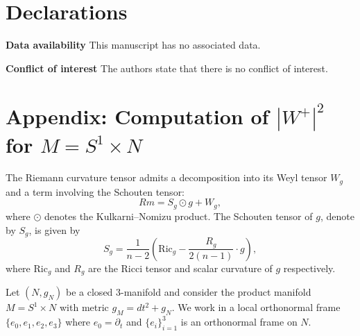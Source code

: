 \documentclass[12pt, twoside]{article}
\theoremstyle{definition}
\numberwithin{equation}{section}
\begin{document}
\section*{Declarations}

\noindent\textbf{Data availability} {This manuscript has no associated data.}

\noindent\textbf{Conflict of interest} The authors state that there is no conflict of interest.


\section*{Appendix: Computation of $|W^+|^2$ for $M = S^1 \times N$}\label{app:compute}
\label{app:Wplus}
The Riemann curvature tensor admits a decomposition into its Weyl tensor $W_{g}$ and a term involving the Schouten tensor:
\begin{equation}
Rm=S_{g}\odot g+W_{g},
\end{equation}
where $\odot$ denotes the Kulkarni--Nomizu product. The Schouten tensor of $g$, denote by $S_{g}$, is given by
\begin{equation}
S_{g}=\frac{1}{n-2}(\mathrm{Ric}_{g}-\frac{R_{g}}{2(n-1)}\cdot g),
\end{equation}
where $\mathrm{Ric}_{g}$ and $R_{g}$ are the Ricci tensor and scalar curvature of $g$ respectively.

Let $(N,g_N)$ be a closed $3$-manifold and consider the product manifold $M = S^1 \times N$ with metric $g_M = dt^2 + g_N$. We work in a local orthonormal frame $\{e_0,e_1,e_2,e_3\}$ where $e_0 = \partial_t$ and $\{e_i\}_{i=1}^3$ is an orthonormal frame on $N$.
\end{document}
